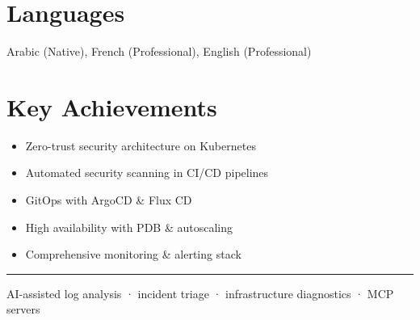 \documentclass[10pt,a4paper]{article}
\begin{document}
\section*{Languages}
Arabic (Native), French (Professional), English (Professional)\par
\section*{Key Achievements}
\begin{itemize}
  \item Zero-trust security architecture on Kubernetes
  \item Automated security scanning in CI/CD pipelines
  \item GitOps with ArgoCD \& Flux CD
  \item High availability with PDB \& autoscaling
  \item Comprehensive monitoring \& alerting stack
\end{itemize}
\vspace{6pt}\hrule\vspace{3pt}
{\footnotesize\color{graytext} AI-assisted log analysis · incident triage · infrastructure diagnostics · MCP servers\par}
\end{document}
